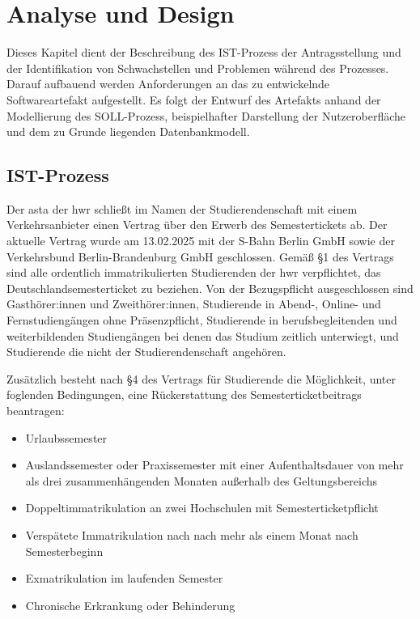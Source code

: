 
\chapter{Analyse und Design}\label{cha:Analyse}
Dieses Kapitel dient der Beschreibung des IST-Prozess der Antragsstellung und der Identifikation von Schwachstellen und Problemen während des Prozesses. Darauf aufbauend werden Anforderungen an das zu entwickelnde Softwareartefakt aufgestellt. Es folgt der Entwurf des Artefakts anhand der Modellierung des SOLL-Prozess, beispielhafter Darstellung der Nutzeroberfläche und dem zu Grunde liegenden Datenbankmodell.
 
\section{IST-Prozess}\label{sec:IstProzess}
Der \gls{asta} der \gls{hwr} schließt im Namen der Studierendenschaft mit einem Verkehrsanbieter einen Vertrag über den Erwerb des Semestertickets ab. Der aktuelle Vertrag wurde am 13.02.2025 mit der S-Bahn Berlin GmbH sowie der Verkehrsbund Berlin-Brandenburg GmbH geschlossen. Gemäß §1 des Vertrags sind alle ordentlich immatrikulierten Studierenden der \gls{hwr} verpflichtet, das Deutschlandsemesterticket zu beziehen. Von der Bezugspflicht ausgeschlossen sind Gasthörer:innen und Zweithörer:innen, Studierende in Abend-, Online- und Fernstudiengängen ohne Präsenzpflicht, Studierende in berufsbegleitenden und weiterbildenden Studiengängen bei denen das Studium zeitlich unterwiegt, und Studierende die nicht der Studierendenschaft angehören. 

Zusätzlich besteht nach §4 des Vertrags für Studierende die Möglichkeit, unter foglenden Bedingungen, eine Rückerstattung des Semesterticketbeitrags beantragen: 
\begin{itemize}
  \item Urlaubssemester
  \item Auslandssemester oder Praxissemester mit einer Aufenthaltsdauer von mehr als drei zusammenhängenden Monaten außerhalb des Geltungsbereichs
  \item Doppeltimmatrikulation an zwei Hochschulen mit Semesterticketpflicht
  \item Verspätete Immatrikulation nach nach mehr als einem Monat nach Semesterbeginn
  \item Exmatrikulation im laufenden Semester
  \item Chronische Erkrankung oder Behinderung
\end{itemize}

